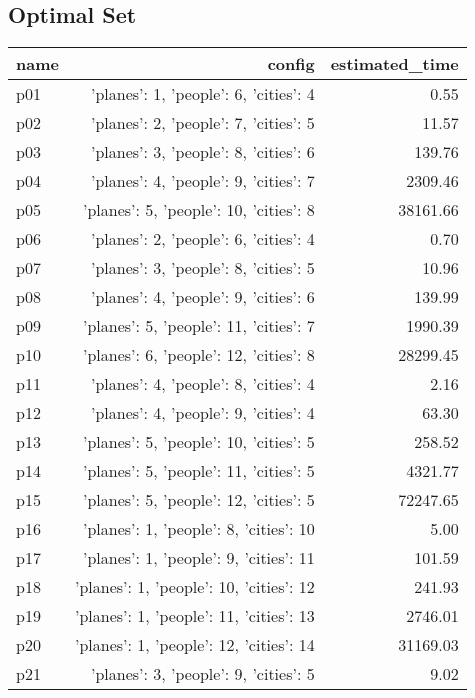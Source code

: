 \documentclass{article}
\begin{document}
                                \subsection*{Optimal Set}
                                
                            \begin{center}
                            \scriptsize
                            \begin{tabular}{@{}l|r|r@{}}
                            name & config & estimated\_time\\\midrule
                              p01&{'planes': 1, 'people': 6, 'cities': 4}&0.55\\
  p02&{'planes': 2, 'people': 7, 'cities': 5}&11.57\\
  p03&{'planes': 3, 'people': 8, 'cities': 6}&139.76\\
  p04&{'planes': 4, 'people': 9, 'cities': 7}&2309.46\\
  p05&{'planes': 5, 'people': 10, 'cities': 8}&38161.66\\
  p06&{'planes': 2, 'people': 6, 'cities': 4}&0.70\\
  p07&{'planes': 3, 'people': 8, 'cities': 5}&10.96\\
  p08&{'planes': 4, 'people': 9, 'cities': 6}&139.99\\
  p09&{'planes': 5, 'people': 11, 'cities': 7}&1990.39\\
  p10&{'planes': 6, 'people': 12, 'cities': 8}&28299.45\\
  p11&{'planes': 4, 'people': 8, 'cities': 4}&2.16\\
  p12&{'planes': 4, 'people': 9, 'cities': 4}&63.30\\
  p13&{'planes': 5, 'people': 10, 'cities': 5}&258.52\\
  p14&{'planes': 5, 'people': 11, 'cities': 5}&4321.77\\
  p15&{'planes': 5, 'people': 12, 'cities': 5}&72247.65\\
  p16&{'planes': 1, 'people': 8, 'cities': 10}&5.00\\
  p17&{'planes': 1, 'people': 9, 'cities': 11}&101.59\\
  p18&{'planes': 1, 'people': 10, 'cities': 12}&241.93\\
  p19&{'planes': 1, 'people': 11, 'cities': 13}&2746.01\\
  p20&{'planes': 1, 'people': 12, 'cities': 14}&31169.03\\
  p21&{'planes': 3, 'people': 9, 'cities': 5}&9.02\\

\end{tabular}
\end{center}
\end{document}
